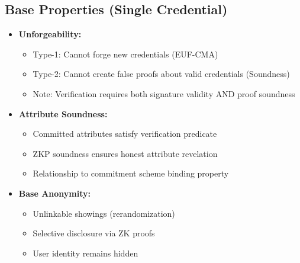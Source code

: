 \subsection{Base Properties (Single Credential)}
\begin{itemize}
    \item \textbf{Unforgeability:}
    \begin{itemize}
        \item Type-1: Cannot forge new credentials (EUF-CMA)
        \item Type-2: Cannot create false proofs about valid credentials (Soundness)
        \item Note: Verification requires both signature validity AND proof soundness
    \end{itemize}
    
    \item \textbf{Attribute Soundness:}
    \begin{itemize}
        \item Committed attributes satisfy verification predicate
        \item ZKP soundness ensures honest attribute revelation
        \item Relationship to commitment scheme binding property
    \end{itemize}

    \item \textbf{Base Anonymity:}
    \begin{itemize}
        \item Unlinkable showings (rerandomization)
        \item Selective disclosure via ZK proofs
        \item User identity remains hidden
    \end{itemize}
\end{itemize}

